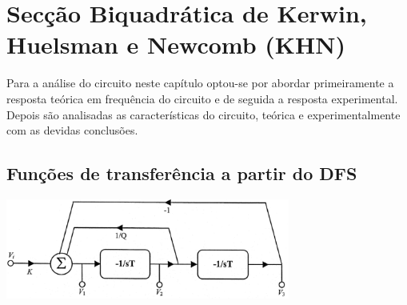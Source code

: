 \documentclass[a4paper,11pt]{report}
\begin{document}


\chapter{Secção Biquadrática de Kerwin, Huelsman e Newcomb (KHN)}

Para a análise do circuito neste capítulo optou-se por abordar primeiramente a resposta teórica em frequência do circuito e de seguida a resposta experimental. Depois são analisadas as características do circuito, teórica e experimentalmente com as devidas conclusões.

\section{Funções de transferência a partir do DFS}

\begin{center}
     \includegraphics[angle=0,width=0.7\textwidth]{dfskhn.png}
     \label{fig:dfskhn}
     \end{center}
\end{document}
